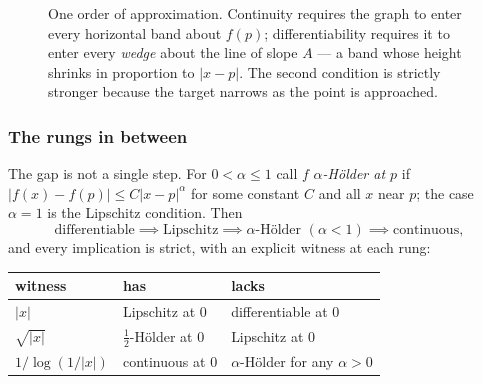 \begin{figure}[htbp]
\centering
{}
\caption{One order of approximation. Continuity requires the graph to enter
every horizontal band about $f(p)$; differentiability requires it to enter
every \emph{wedge} about the line of slope $A$ --- a band whose height
shrinks in proportion to $|x-p|$. The second condition is strictly stronger
because the target narrows as the point is approached.}
\label{fig:wedge}
\end{figure}

\subsubsection*{The rungs in between}

The gap is not a single step. For $0<\alpha\le1$ call $f$ \emph{$\alpha$-Hölder
at $p$} if $|f(x)-f(p)| \le C|x-p|^{\alpha}$ for some constant $C$ and all
$x$ near $p$; the case $\alpha=1$ is the Lipschitz condition. Then
\[ \text{differentiable} \implies \text{Lipschitz} \implies
   \alpha\text{-H\"older } (\alpha<1) \implies \text{continuous}, \]
and every implication is strict, with an explicit witness at each rung:

\begin{center}
\begin{tabular}{@{}lll@{}}
\toprule
\textbf{witness} & \textbf{has} & \textbf{lacks} \\
\midrule
$|x|$                & Lipschitz at $0$          & differentiable at $0$ \\
$\sqrt{|x|}$         & $\tfrac12$-Hölder at $0$  & Lipschitz at $0$ \\
$1/\log(1/|x|)$      & continuous at $0$         & $\alpha$-Hölder for any $\alpha>0$ \\
\bottomrule
\end{tabular}
\end{center}

